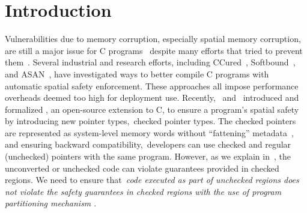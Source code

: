 \section{Introduction}\label{sec:intros}

Vulnerabilities due to memory corruption, especially spatial memory corruption, 
are still a major issue for C programs~\cite{cvetrend, microsoftmemsafe, Zeng:2013:SRF:2534766.2534798} 
despite many efforts that tried to prevent them~\cite{song2019sanitizing}.
Several industrial and research efforts, including CCured~\cite{Necula2005},
Softbound~\cite{softbound}, and ASAN~\cite{Serebryany2012},
have investigated ways to better compile C programs with automatic spatial safety enforcement.
These approaches all impose performance overheads deemed too high for deployment use. 
% 
Recently,~\citet{Elliott2018} and~\citet{li22checkedc} introduced and formalized \checkedc, an
open-source extension to C,
to ensure a program’s spatial safety by introducing new pointer types,~\ie checked pointer types.
%
The checked pointers are represented as system-level memory words without ``fattening'' metadata~\cite{duck2016heap}, 
and ensuring backward compatibility,~\ie developers can use checked and regular (unchecked) pointers with the same program.
However, as we explain in~, the
unconverted or unchecked code can violate guarantees provided in checked
regions.
%
We need to ensure that~\emph{code executed as part of 
unchecked regions does not violate the safety guarantees in checked regions  with the use of program partitioning mechanism \cite{rul2009towards}}.

